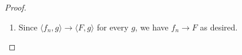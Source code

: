\documentclass[12pt]{article}
\theoremstyle{definition}
\begin{document}
\begin{proof}
\begin{enumerate}[label=(\alph*)]
          Indeed, \begin{align*}
            \Lambda (\alpha \varphi + \beta \psi) & = \lim_{n \to \infty} \int_a^b f_n (\alpha\varphi + \beta\psi) dx \\
            & = \lim_{n \to \infty} \int_a^b \alpha f_n \varphi + \beta f_n \psi dx \\
            & = \lim_{n \to \infty} \alpha \int_a^b f_n \varphi + \lim_{n \to \infty} \beta\int_{n \to \infty}  f_n \psi dx \\
            & = \alpha\Lambda(\varphi) + \beta\Lambda(\psi),
          \end{align*}
          and whenever $g \not\equiv 0$, \begin{equation*}
            \frac{||\Lambda g||}{||g||} \leq \frac{M||g||}{||g||} = M,
          \end{equation*}
          so $\Lambda$ is linear and bounded, and Riesz gives us the $F$ we want.
		\item Since $\langle f_n, g \rangle \to \langle F, g \rangle$ for every $g$, we have $f_n \to F$ as desired.
	\end{enumerate}
\end{proof}
\end{document}
